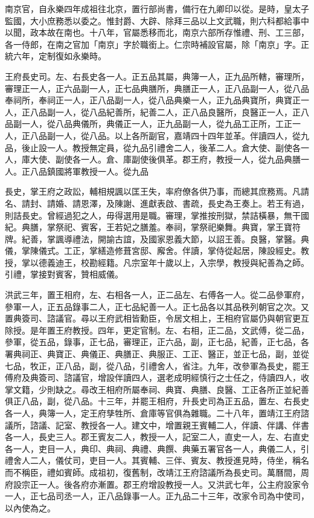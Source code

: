 南京官，自永樂四年成祖往北京，置行部尚書，備行在九卿印以從。是時，皇太子監國，大小庶務悉以委之。惟封爵、大辟、除拜三品以上文武職，則六科都給事中以聞，政本故在南也。十八年，官屬悉移而北，南京六部所存惟禮、刑、工三部，各一侍郎，在南之官加「南京」字於職銜上。仁宗時補設官屬，除「南京」字。正統六年，定制復如永樂時。

王府長史司。左、右長史各一人。正五品其屬，典簿一人，正九品所轄，審理所，審理正一人，正六品副一人，正七品典膳所，典膳正一人，正八品副一人，從八品奉祠所，奉祠正一人，正八品副一人，從八品典樂一人，正九品典寶所，典寶正一人，正八品副一人，從八品紀善所，紀善二人，正八品良醫所，良醫正一人，正八品副一人，從八品典儀所，典儀正一人，正九品副一人，從九品工正所，工正一人，正八品副一人，從八品。以上各所副官，嘉靖四十四年並革。伴讀四人，從九品，後止設一人。教授無定員，從九品引禮舍二人，後革二人。倉大使、副使各一人，庫大使、副使各一人。倉、庫副使後俱革。郡王府，教授一人，從九品典膳一人。正八品鎮國將軍教授一人。從九品

長史，掌王府之政訟，輔相規諷以匡王失，率府僚各供乃事，而總其庶務焉。凡請名、請封、請婚、請恩澤，及陳謝、進獻表啟、書疏，長史為王奏上。若王有過，則詰長史。曾經過犯之人，毋得選用是職。審理，掌推按刑獄，禁詰橫暴，無干國紀。典膳，掌祭祀、賓客，王若妃之膳羞。奉祠，掌祭祀樂舞。典寶，掌王寶符牌。紀善，掌諷導禮法，開諭古誼，及國家恩義大節，以詔王善。良醫，掌醫。典儀，掌陳儀式。工正，掌繕造修葺宮邸、廨舍。伴讀，掌侍從起居，陳設經史。教授，掌以德義迪王，校勘經籍。凡宗室年十歲以上，入宗學，教授與紀善為之師。引禮，掌接對賓客，贊相威儀。

洪武三年，置王相府，左、右相各一人，正二品左、右傅各一人。從二品參軍府，參軍一人，正五品錄事二人，正七品紀善一人。正七品各以其品秩列朝官之次。又置典簽司、諮議官。尋以王府武相皆勳臣，令居文相上，王相府官屬仍與朝官更互除授。是年置王府教授。四年，更定官制。左、右相，正二品，文武傅，從二品，參軍，從五品，錄事，正七品，審理正，正六品，副，正七品，紀善，正七品，各署典祠正、典寶正、典儀正、典膳正、典服正、工正、醫正，並正七品，副，並從七品，牧正，正八品，副，從八品，引禮舍人，省注。九年，改參軍為長史，罷王傅府及典簽司、諮議官，增設伴讀四人，選老成明經慎行之士任之，侍讀四人，收掌文籍，少則缺之。尋改王相府所屬奉祠、典寶、典膳、良醫、工正各所正並紀善俱正八品，副，從八品。十三年，并罷王相府，升長史司為正五品，置左、右長史各一人，典簿一人，定王府孳牲所、倉庫等官俱為雜職。二十八年，置靖江王府諮議所，諮議、記室、教授各一人。建文中，增置親王賓輔二人，伴讀、伴講、伴書各一人，長史三人。郡王賓友二人，教授一人，記室二人，直史一人，左、右直史各一人，吏目一人，典印、典祠、典禮、典饌、典藥五署官各一人，典儀二人，引禮舍人二人，儀仗司，吏目一人。其賓輔、三伴、賓友、教授進見時，侍坐，稱名而不稱臣，禮如賓師。成祖初，復舊制，改靖江王府諮議所為長史司。萬曆間，周府設宗正一人。後各府亦漸置。郡王府增設教授一人。又洪武七年，公主府設家令一人，正七品司丞一人，正八品錄事一人。正九品二十三年，改家令司為中使司，以內使為之。

